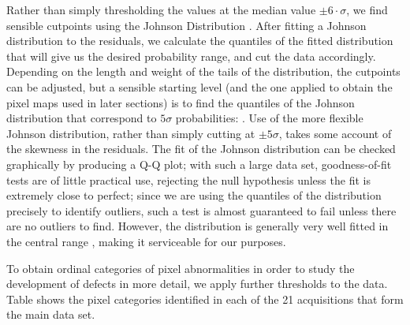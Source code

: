\documentclass[\main/IO-Pixels.tex]{subfiles}
\begin{document}
Rather than simply thresholding the values at the median value $\pm 6 \cdot \sigma$, we find sensible cutpoints using the Johnson Distribution . After fitting a Johnson distribution to the residuals, we calculate the quantiles of the fitted distribution that will give us the desired probability range, and cut the data accordingly. Depending on the length and weight of the tails of the distribution, the cutpoints can be adjusted, but a sensible starting level (and the one applied to obtain the pixel maps used in later sections) is to find the quantiles of the Johnson distribution that correspond to $5\sigma$ probabilities: . Use of the more flexible Johnson distribution, rather than simply cutting at $\pm 5\sigma$, takes some account of the skewness in the residuals. The fit of the Johnson distribution can be checked graphically by producing a Q-Q plot; with such a large data set, goodness-of-fit tests are of little practical use, rejecting the null hypothesis unless the fit is extremely close to perfect; since we are using the quantiles of the distribution precisely to identify outliers, such a test is almost guaranteed to fail unless there are no outliers to find. However, the distribution is generally very well fitted in the central range , making it serviceable for our purposes.

To obtain ordinal categories of pixel abnormalities in order to study the development of defects in more detail, we apply further thresholds to the data. Table  shows the pixel categories identified in each of the 21 acquisitions that form the main data set.



\end{document}
